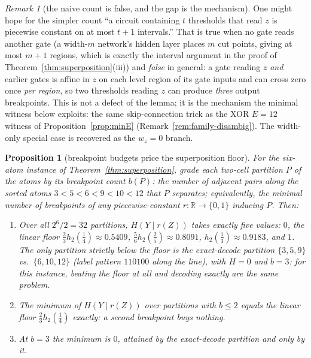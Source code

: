 \documentclass[twocolumn,10pt]{article}
\newtheorem{proposition}[theorem]{Proposition}
\theoremstyle{definition}
\theoremstyle{remark}
\newtheorem{remark}[theorem]{Remark}
\newcommand{\R}{\mathbb{R}}
\newcommand{\hb}{h_2}
\begin{document}
\begin{remark}[the naive count is false, and the gap is the mechanism]
\label{rem:naive-count}
One might hope for the simpler count ``a circuit containing $t$
thresholds that read $z$ is piecewise constant on at most $t + 1$
intervals.'' That is true when no gate reads another gate (a
width-$m$ network's hidden layer places $m$ cut points, giving at most
$m + 1$ regions, which is exactly the interval argument in the proof of
Theorem~\ref{thm:superposition}(iii)) and \emph{false} in general:
a gate reading $z$ \emph{and} earlier gates is affine in $z$ on each
level region of its gate inputs and can cross zero once \emph{per
region}, so two thresholds reading $z$ can produce \emph{three} output
breakpoints. This is not a defect of the lemma; it is the mechanism the
minimal witness below exploits: the same skip-connection trick as
the XOR $E = 12$ witness of Proposition~\ref{prop:minE}
(Remark~\ref{rem:family-disambig}). The width-only special case is
recovered as the $w_z = 0$ branch.
\end{remark}

\begin{proposition}[breakpoint budgets price the superposition floor]
\label{prop:bp-entropy}
For the six-atom instance of Theorem~\ref{thm:superposition}, grade
each two-cell partition $P$ of the atoms by its \emph{breakpoint count}
$b(P)$: the number of adjacent pairs along the sorted atoms
$3 < 5 < 6 < 9 < 10 < 12$ that $P$ separates; equivalently, the
minimal number of breakpoints of any piecewise-constant
$r : \R \to \{0,1\}$ inducing $P$. Then:
\begin{enumerate}
\item[(i)] Over all $2^6/2 = 32$ partitions, $H(Y \mid r(Z))$ takes
exactly five values: $0$, the linear floor
$\tfrac23 \hb(\tfrac14) \approx 0.5409$,
$\tfrac56 \hb(\tfrac25) \approx 0.8091$,
$\hb(\tfrac13) \approx 0.9183$, and $1$. The only partition strictly
below the floor is the exact-decode partition $\{3,5,9\}$ vs.\
$\{6,10,12\}$ (label pattern $110100$ along the line), with $H = 0$ and
$b = 3$: for this instance, beating the floor at all and decoding
exactly are the same problem.
\item[(ii)] The minimum of $H(Y \mid r(Z))$ over partitions with
$b \le 2$ equals the linear floor $\tfrac23 \hb(\tfrac14)$ exactly: a
second breakpoint buys nothing.
\item[(iii)] At $b = 3$ the minimum is $0$, attained by the
exact-decode partition and only by it.
\end{enumerate}
\end{proposition}
\end{document}
